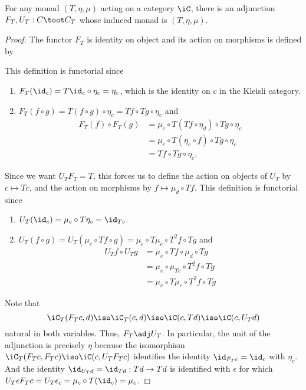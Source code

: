 \documentclass{amsart}
\begin{document}
\begin{lem}\label{lem:monad-to-adjunction-kleisli}
  For any monad $(T, \eta, \mu)$ acting on a category $\iC$, there is an adjunction $F_{T},U_{T}: C \toot C_{T}$ whose induced monad is $(T, \eta, \mu)$.
\end{lem}
\begin{proof}
  The functor $F_{T}$ is identity on object and its action on morphisms is defined by
  
  This definition is functorial since
  \begin{enumerate}
  \item $F_{T}(\id_{c}) = T\id_{c} \circ \eta_{c} = \eta_{c}$, which is the identity on $c$ in the Kleisli category.
  \item $F_{T}(f \circ g) = T(f \circ g) \circ \eta_{c} = Tf \circ Tg \circ \eta_{c}$ and
    \begin{align}
      F_{T}(f) \circ F_{T}(g) &= \mu_{e} \circ T(Tf \circ \eta_{d}) \circ Tg \circ \eta_{c}\\
                          &= \mu_{e} \circ T(\eta_{e} \circ f) \circ Tg \circ \eta_{c}\\
                          &= Tf \circ Tg \circ \eta_{c},
    \end{align}
  \end{enumerate}

  Since we want $U_{T}F_{T} = T$, this forces us to define the action on objects of $U_{T}$ by $c \mapsto Tc$, and the action on morphisms by $f \mapsto \mu_{d} \circ Tf$.
  This definition is functorial since
  \begin{enumerate}
  \item $U_{T}(\id_{c}) = \mu_{c} \circ T\eta_{c} = \id_{Tc}$.
  \item $U_{T}(f \circ g) = U_{T}(\mu_{e} \circ Tf \circ g) = \mu_{e} \circ T\mu_{e} \circ T^{2}f \circ Tg$ and
    \begin{align}
      U_{T}f \circ U_{T}g &= \mu_{e} \circ Tf \circ \mu_{d} \circ Tg\\
                      &= \mu_{e} \circ \mu_{Te} \circ T^{2}f \circ Tg\\
                      &= \mu_{e} \circ T\mu_{e} \circ T^{2}f \circ Tg
    \end{align}
  \end{enumerate}
  Note that
  \[
    \iC_{T}(F_{T}c,d) \iso \iC_{T}(c,d) \iso \iC(c,Td) \iso \iC(c,U_{T}d)
  \]
  natural in both variables.
  Thus, $F_{T} \adj U_{T}$.
  In particular, the unit of the adjunction is precisely $\eta$ because the isomorphism $\iC_{T}(F_{T}c,F_{T}c) \iso \iC(c,U_{T}F_{T}c)$ identifies the identity $\id_{F_{T}c} = \id_{c}$ with $\eta_{c}$.
  And the identity $\id_{U_{T}d} = \id_{Td} : Td \to Td$ is identified with $\epsilon$ for which $U_{T}\epsilon F_{T}c = U_{T}\epsilon_{c} = \mu_{c} \circ T(\id_{c}) = \mu_{c}$.
\end{proof}
\end{document}
